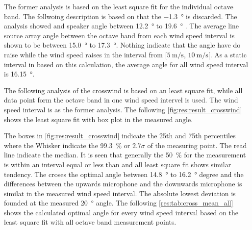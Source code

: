 The former analysis is based on the least square fit for the individual octave band. The follwoing description is based on that the \SI{-1.3}{\degree} is discarded. The analysis showed and speaker angle between  \SI{12.2}{\degree} to  \SI{19.6}{\degree} . The average line source array angle between the octave band from each wind speed interval is shown to be between \SI{15.0}{\degree} to \SI{17.3}{\degree}. Nothing indicate that the angle have do raise while the wind speed raises in the interval from $[\SI{5}{\meter\per\second},\, \SI{10}{\meter\per\second}[ $. As a static interval in based on this calculation, the average angle for all wind speed interval is \SI{16.15}{\degree}.

The following analysis of the crosswind is based on an least square fit, while all data point form the octave band in one wind speed intervel is used. The wind speed interval is as the former analysis. The following \autoref{fig:res:result_crosswind} shows the least square fit with box plot in the measured angle. 
 
 
 

 
The boxes in \autoref{fig:res:result_crosswind} indicate the 25th and 75th percentiles where the Whisker indicate the \SI{99.3}{\percent} or $2.7\sigma$ of the measuring point. The read line indicate the median. It is seen that generally the \SI{50}{\percent} for the measurement is within an interval equal or less than  and all least square fit shows similar tendency. The croses the optimal angle between \SI{14.8}{\degree} to \SI{16.2}{\degree}  degree and the differences between the upwards microphone and the downwards microphone is similat in the measured wind speed interval. The absolute lowest deviation is founded at the measured \SI{20}{\degree} angle. The following \autoref{res:tab:cross_mean_all} shows the calculated optimal angle for every wind speed interval based on the least square fit with all octave band measurement points.
 
